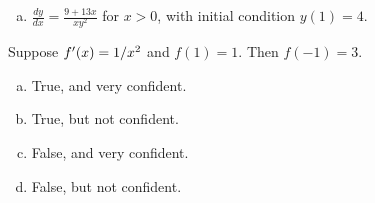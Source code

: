 \documentclass[answers]{exam}
\begin{document}
\begin{questions}
\begin{enumerate}[(a)]
\item $\frac{dy}{dx} = \frac{9+13x}{xy^2}$ for $x>0$, with initial condition $y(1) = 4$.

\hfill \break
\hfill \break
\hfill \break
\hfill \break
\hfill \break
\hfill \break
\hfill \break
\hfill \break
\hfill \break
\hfill \break
\hfill \break
\hfill \break
\hfill \break



\end{enumerate}

\question Suppose $f\rq{}(x) = 1/x^2$ and $f(1) = 1$. Then $f(-1) = 3$.
\begin{enumerate}[(a)]
\item True, and very confident.
\item True, but not confident.
\item False, and very confident.
\item False, but not confident.
\end{enumerate}

\end{questions}
\end{document}
